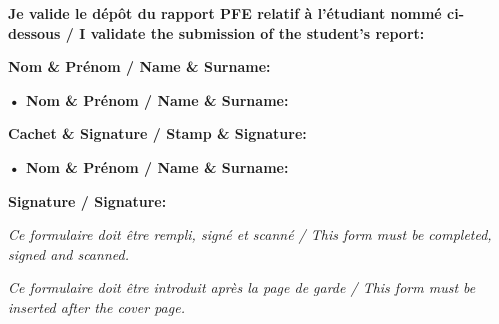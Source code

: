 

\thispagestyle{empty}


\noindent \textbf{Je valide le dépôt du rapport PFE relatif à l’étudiant nommé ci-dessous / I validate the submission of the student’s report:}

\vspace{1cm}

\noindent \textbf{Nom \& Prénom / Name \& Surname:} \dotfill

\vspace{1.5cm}

\begin{tcolorbox}[colback=black!5!white, colframe=black, title=Encadrant Entreprise / Business site Supervisor, width=\textwidth, boxrule=0.5pt]
	\textbf{• Nom \& Prénom / Name \& Surname:} \dotfill

	\vspace{1cm}

	\textbf{Cachet \& Signature / Stamp \& Signature:}

	\vspace{2cm} %
\end{tcolorbox}

\vspace{1.5cm}

\begin{tcolorbox}[colback=black!5!white, colframe=black, title=Encadrant Académique / Academic Supervisor, width=\textwidth, boxrule=0.5pt]
	\textbf{• Nom \& Prénom / Name \& Surname:} \dotfill

	\vspace{1cm}

	\textbf{Signature / Signature:}

	\vspace{2cm} %
\end{tcolorbox}

\vspace{2cm}

\noindent \textit{Ce formulaire doit être rempli, signé et scanné / This form must be completed, signed and scanned.}

\vspace{0.2cm}

\noindent \textit{Ce formulaire doit être introduit après la page de garde / This form must be inserted after the cover page.}

\vfill
